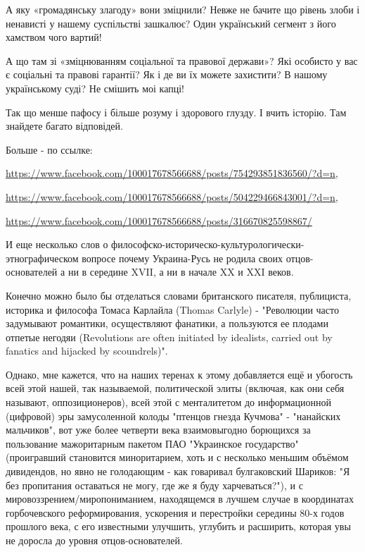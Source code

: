 \begin{itemize}
\begin{itemize}
А яку «громадянську злагоду» вони зміцнили? Невже не бачите що рівень злоби і
ненависті у нашему суспільстві зашкалює? Один український сегмент з його
хамством чого вартий!

А що там зі «зміцнюванням соціальної та правової держави»? Які особисто у вас є
соціальні та правові гарантії? Як і де ви їх можете захистити? В нашому
українському суді? Не смішить моі капці!

Так що менше пафосу і більше розуму і здорового глузду. І вчить історію. Там знайдете багато відповідей.

Больше - по ссылке: 

\url{https://www.facebook.com/100017678566688/posts/754293851836560/?d=n}, 

\url{https://www.facebook.com/100017678566688/posts/504229466843001/?d=n}, 

\url{https://www.facebook.com/100017678566688/posts/316670825598867/}

 

И еще несколько слов о философско-историческо-культурологически-этнографическом
вопросе почему Украина-Русь не родила своих отцов-основателей а ни в середине
XVII, а ни в начале XX и XXI веков.

Конечно можно было бы отделаться словами британского писателя, публициста,
историка и философа Томаса Карлайла (Thomas Carlyle) - "Революции часто
задумывают романтики, осуществляют фанатики, а пользуются ее плодами отпетые
негодяи (Revolutions are often initiated by idealists, carried out by fanatics
and hijacked by scoundrels)".

Однако, мне кажется, что на наших теренах к этому добавляется ещё и убогость
всей этой нашей, так называемой, политической элиты (включая, как они себя
называют, оппозиционеров), всей этой с менталитетом до информационной
(цифровой) эры замусоленной колоды "птенцов гнезда Кучмова" - "нанайских
мальчиков", вот уже более четверти века взаимовыгодно борющихся за пользование
мажоритарным пакетом ПАО "Украинское государство" (проигравший становится
миноритарием, хоть и с несколько меньшим объёмом дивидендов, но явно не
голодающим - как говаривал булгаковский Шариков: "Я без пропитания оставаться
не могу, где же я буду харчеваться?"), и с мировоззрением/миропониманием,
находящемся в лучшем случае в координатах горбочевского реформирования,
ускорения и перестройки середины 80-х годов прошлого века, с его известными
улучшить, углубить и расширить, которая увы не доросла до уровня
отцов-основателей.


\end{itemize}
\end{itemize}
